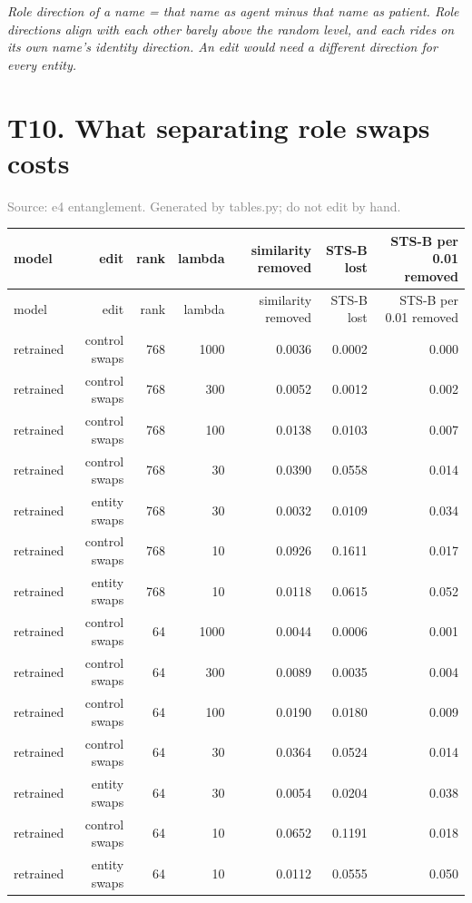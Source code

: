 \documentclass[10pt]{article}
\begin{document}
\textit{Role direction of a name = that name as agent minus that name as patient. Role directions align with each other barely above the random level, and each rides on its own name's identity direction. An edit would need a different direction for every entity.}
\clearpage

\section*{T10. What separating role swaps costs}
\textcolor{gray}{Source: e4 entanglement. Generated by tables.py; do not edit by hand.}

\footnotesize
\begin{longtable}{lrrrrrr}
\toprule
model & edit & rank & lambda & similarity removed & STS-B lost & STS-B per 0.01 removed \\
\midrule
\endfirsthead
\toprule
model & edit & rank & lambda & similarity removed & STS-B lost & STS-B per 0.01 removed \\
\midrule
\endhead
\bottomrule
\endfoot
retrained & control swaps & 768 & 1000 & 0.0036 & 0.0002 & 0.000 \\
retrained & control swaps & 768 & 300 & 0.0052 & 0.0012 & 0.002 \\
retrained & control swaps & 768 & 100 & 0.0138 & 0.0103 & 0.007 \\
retrained & control swaps & 768 & 30 & 0.0390 & 0.0558 & 0.014 \\
retrained & entity swaps & 768 & 30 & 0.0032 & 0.0109 & 0.034 \\
retrained & control swaps & 768 & 10 & 0.0926 & 0.1611 & 0.017 \\
retrained & entity swaps & 768 & 10 & 0.0118 & 0.0615 & 0.052 \\
retrained & control swaps & 64 & 1000 & 0.0044 & 0.0006 & 0.001 \\
retrained & control swaps & 64 & 300 & 0.0089 & 0.0035 & 0.004 \\
retrained & control swaps & 64 & 100 & 0.0190 & 0.0180 & 0.009 \\
retrained & control swaps & 64 & 30 & 0.0364 & 0.0524 & 0.014 \\
retrained & entity swaps & 64 & 30 & 0.0054 & 0.0204 & 0.038 \\
retrained & control swaps & 64 & 10 & 0.0652 & 0.1191 & 0.018 \\
retrained & entity swaps & 64 & 10 & 0.0112 & 0.0555 & 0.050 \\

\end{longtable}
\end{document}

